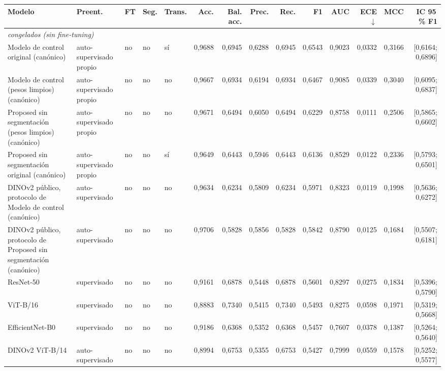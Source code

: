 \begin{table}[ht]
\centering
\scriptsize
\setlength{\tabcolsep}{3pt}
\begin{tabular}{@{}lllllrrrrrrrrr@{}}
\toprule
Modelo & Preent. & FT & Seg. & Trans. & Acc. & Bal. acc. & Prec. & Rec. & F1 & AUC & ECE$\downarrow$ & MCC & IC 95\,\% F1 \\
\midrule
\multicolumn{14}{l}{\textit{congelados (sin fine-tuning)}} \\
\midrule
Modelo de control original (canónico) & auto-supervisado propio & no & no & sí & 0,9688 & 0,6945 & 0,6288 & 0,6945 & 0,6543 & 0,9023 & 0,0332 & 0,3166 & [0,6164; 0,6896] \\
Modelo de control (pesos limpios) (canónico) & auto-supervisado propio & no & no & no & 0,9667 & 0,6934 & 0,6194 & 0,6934 & 0,6467 & 0,9085 & 0,0339 & 0,3040 & [0,6095; 0,6837] \\
Proposed sin segmentación (pesos limpios) (canónico) & auto-supervisado propio & no & no & no & 0,9671 & 0,6494 & 0,6050 & 0,6494 & 0,6229 & 0,8758 & 0,0111 & 0,2506 & [0,5865; 0,6602] \\
Proposed sin segmentación original (canónico) & auto-supervisado propio & no & no & sí & 0,9649 & 0,6443 & 0,5946 & 0,6443 & 0,6136 & 0,8529 & 0,0122 & 0,2336 & [0,5793; 0,6501] \\
DINOv2 público, protocolo de Modelo de control (canónico) & auto-supervisado & no & no & no & 0,9634 & 0,6234 & 0,5809 & 0,6234 & 0,5971 & 0,8323 & 0,0119 & 0,1998 & [0,5636; 0,6272] \\
DINOv2 público, protocolo de Proposed sin segmentación (canónico) & auto-supervisado & no & no & no & 0,9706 & 0,5828 & 0,5856 & 0,5828 & 0,5842 & 0,8790 & 0,0125 & 0,1684 & [0,5507; 0,6181] \\
ResNet-50 & supervisado & no & no & no & 0,9161 & 0,6878 & 0,5448 & 0,6878 & 0,5601 & 0,8297 & 0,0275 & 0,1834 & [0,5396; 0,5790] \\
ViT-B/16 & supervisado & no & no & no & 0,8883 & 0,7340 & 0,5415 & 0,7340 & 0,5493 & 0,8275 & 0,0598 & 0,1971 & [0,5319; 0,5668] \\
EfficientNet-B0 & supervisado & no & no & no & 0,9186 & 0,6368 & 0,5352 & 0,6368 & 0,5457 & 0,7607 & 0,0378 & 0,1387 & [0,5264; 0,5640] \\
DINOv2 ViT-B/14 & auto-supervisado & no & no & no & 0,8994 & 0,6753 & 0,5355 & 0,6753 & 0,5427 & 0,7999 & 0,0559 & 0,1578 & [0,5252; 0,5577] \\

\end{tabular}
\end{table}
